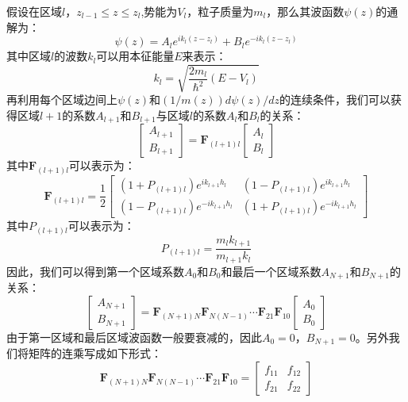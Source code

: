 假设在区域$l$，$z_{l-1} \leqslant z \leqslant z_{l}$,势能为$V_l$，粒子质量为$m_l$，那么其波函数$\psi(z)$的通解为：
\begin{equation}
\label{Equ:generalsolutionsch}
\psi(z) = A_le^{ik_l(z-z_l)}+B_le^{-ik_l(z-z_l)}
\end{equation}
其中区域$l$的波数$k_l$可以用本征能量$E$来表示：
\begin{equation}
\label{Equ:kl}
k_l = \sqrt{\frac{2m_l}{\hbar^2}(E-V_l)}
\end{equation}
再利用每个区域边间上$\psi(z)$和$(1/m(z))d\psi(z)/dz$的连续条件，我们可以获得区域$l+1$的系数$A_{l+1}$和$B_{l+1}$与区域$l$的系数$A_l$和$B_l$的关系：
\begin{equation}
\label{Equ:ABrelation}
\begin{bmatrix}
A_{l+1}\\
B_{l+1}
\end{bmatrix} = \textbf{F}_{(l+1)l}\begin{bmatrix}
A_{l}\\
B_{l}
\end{bmatrix}
\end{equation}
其中$\textbf{F}_{(l+1)l}$可以表示为：
\begin{equation}
\label{Equ:Fdetail}
\textbf{F}_{(l+1)l} = \frac{1}{2}\begin{bmatrix}
(1+P_{(l+1)l})e^{ik_{l+1}h_l}&(1-P_{(l+1)l})e^{ik_{l+1}h_l}\\
(1-P_{(l+1)l})e^{-ik_{l+1}h_l}&(1+P_{(l+1)l})e^{-ik_{l+1}h_l}
\end{bmatrix}
\end{equation}
其中$P_{(l+1)l}$可以表示为：
\begin{equation}
\label{Equ:Pdetail}
P_{(l+1)l} = \frac{m_lk_{l+1}}{m_{l+1}k_{l}}
\end{equation}
因此，我们可以得到第一个区域系数$A_{0}$和$B_{0}$和最后一个区域系数$A_{N+1}$和$B_{N+1}$的关系：
\begin{equation}
\label{Equ:Fmulti}
\begin{bmatrix}
A_{N+1}\\
B_{N+1}
\end{bmatrix} = \textbf{F}_{(N+1)N}\textbf{F}_{N(N-1)}\cdots\textbf{F}_{21}\textbf{F}_{10}\begin{bmatrix}
A_{0}\\
B_{0}
\end{bmatrix}
\end{equation}
由于第一区域和最后区域波函数一般要衰减的，因此$A_0 = 0$，$B_{N+1} = 0$。另外我们将矩阵的连乘写成如下形式：
\begin{equation}
\label{Equ:Fsimple}
\textbf{F}_{(N+1)N}\textbf{F}_{N(N-1)}\cdots\textbf{F}_{21}\textbf{F}_{10} = \begin{bmatrix}
f_{11}&f_{12}\\
f_{21}&f_{22}
\end{bmatrix}
\end{equation}
